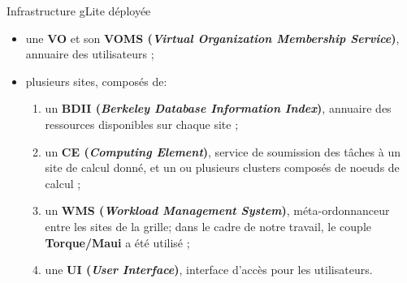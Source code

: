 \documentclass[final]{beamer}
\begin{document}
\begin{frame}{}
\begin{center}
\begin{columns}[t]
\begin{column}{.48\linewidth}
	\begin{block}{Infrastructure gLite déployée}
\begin{itemize}

	\item une \textbf{VO} et son \textbf{VOMS (\textsl{Virtual Organization Membership Service})},
	annuaire des utilisateurs ;
					\bigskip

\item plusieurs sites, composés de:

		\bigskip
\begin{enumerate}

	\item un \textbf{BDII (\textsl{Berkeley Database Information Index})}, annuaire
		des ressources disponibles sur chaque site ;

		\bigskip

	\item un \textbf{CE (\textsl{Computing Element})}, service de soumission des
		tâches à un site de calcul donné, et un ou plusieurs clusters composés de noeuds de calcul ;

		\bigskip
	\item un \textbf{WMS (\textsl{Workload Management System})}, méta-ordonnanceur entre les sites de la grille; dans le cadre de
		notre travail, le couple \textbf{Torque/Maui} a été utilisé ;
		\bigskip

	\item une \textbf{UI (\textsl{User Interface})}, interface d'accès pour les
		utilisateurs.

\end{enumerate}
\end{itemize}
	\end{block}

      \end{column}
\end{columns}
\end{center}
\end{frame}
\end{document}
